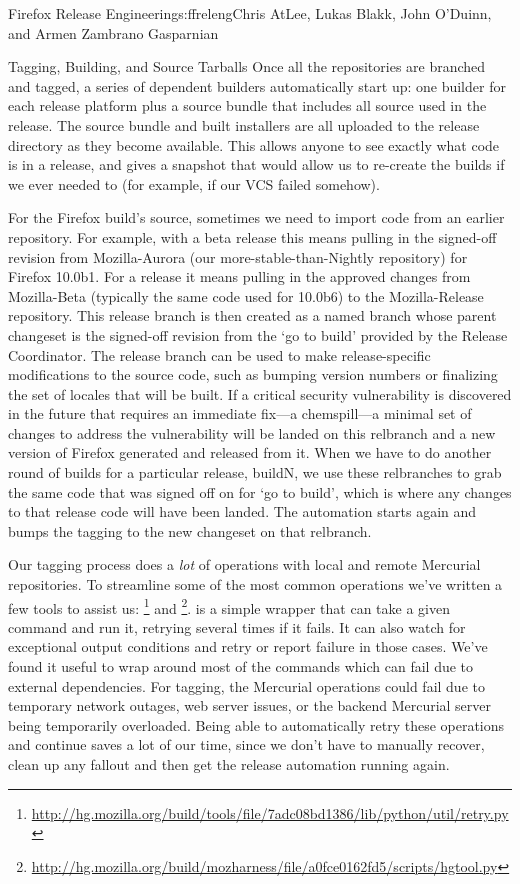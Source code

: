 \begin{aosachapter}{Firefox Release Engineering}{s:ffreleng}{Chris AtLee, Lukas Blakk, John O'Duinn, and Armen Zambrano Gasparnian}
\begin{aosasect1}{Tagging, Building, and Source Tarballs}
Once all the repositories are branched and tagged, a series of dependent builders
automatically start up: one builder for each release platform plus a
source bundle that includes all source used in the release.  The source
bundle and built installers are all uploaded to the release directory
as they become available.  This allows anyone to see exactly what code
is in a release, and gives a snapshot that would allow us to re-create
the builds if we ever needed to (for example, if our VCS failed somehow).
 
For the Firefox build's source, sometimes we need to import code
from an earlier repository. For example, with a beta release this means
pulling in the signed-off revision from Mozilla-Aurora (our
more-stable-than-Nightly repository) for Firefox 10.0b1. For a release it
means pulling in the approved changes from Mozilla-Beta (typically the
same code used for 10.0b6) to the Mozilla-Release repository.  This release
branch is then created as a named branch whose parent changeset is
the signed-off revision from the `go to build' provided by the Release
Coordinator. The release branch can be used to make release-specific
modifications to the source code, such as bumping version numbers or
finalizing the set of locales that will be built. If a critical
security vulnerability is discovered in the future that requires an
immediate fix---a chemspill---a minimal set of changes to
address the vulnerability will be landed on this relbranch and a new
version of Firefox generated and released from it. When we have to do another round of
builds for a particular release, buildN, we use these relbranches to
grab the same code that was signed off on for `go to build', which is
where any changes to that release code will have been landed. The
automation starts again and bumps the tagging to the new changeset on
that relbranch.
    
Our tagging process does a \emph{lot} of operations with local and
remote Mercurial repositories. To streamline some of the most
common operations we've written a few tools to assist us:
\footnote{\url{http://hg.mozilla.org/build/tools/file/7adc08bd1386/lib/python/util/retry.py}}
and
\footnote{\url{http://hg.mozilla.org/build/mozharness/file/a0fce0162fd5/scripts/hgtool.py}}.
 is a simple wrapper that can take a given command and
run it, retrying several times if it fails. It can also watch for
exceptional output conditions and retry or report failure in those
cases. We've found it useful to wrap  around most of the
commands which can fail due to external dependencies.  For tagging,
the Mercurial operations could fail due to temporary network outages, web
server issues, or the backend Mercurial server being temporarily
overloaded. Being able to automatically retry these operations and
continue saves a lot of our time, since we don't have to manually
recover, clean up any fallout and then get the release automation running again.
    

\end{aosasect1}
\end{aosachapter}
